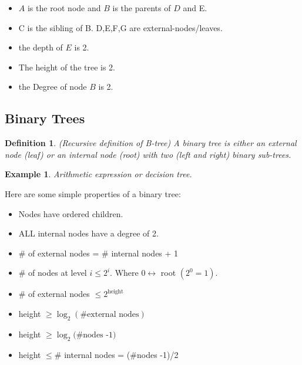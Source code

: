 \documentclass[9pt]{article} %
\newtheorem*{def_}{Definition}
\newtheorem{ex}{Example}
\begin{document}
		\begin{center}
		\end{center}
		\begin{itemize}
			\item $A$ is the root node and $B$ is the parents of $D$ and E.
			\item C is the sibling of B. D,E,F,G are external-nodes/leaves.
			\item the depth of $E$ is 2.
			\item The height of the tree is 2.
			\item the Degree of node $B$ is 2.
		\end{itemize}
		
		\subsection*{Binary Trees}
		
		\begin{def_}
			(Recursive definition of B-tree) A binary tree is either an external node (leaf) or an internal node (root) with two (left and right) binary sub-trees.
		\end{def_}
		\begin{ex}
			Arithmetic expression or decision tree.
		\end{ex}
		Here are some simple properties of a binary tree:
		\begin{itemize}
			\item Nodes have ordered children.
			\item ALL internal nodes have a degree of 2.
			\item \# of external nodes = \# internal nodes + 1
			\item \# of nodes at level $i \leq 2^i$. Where $0 \leftrightarrow$ root $(2^0 = 1)$.
			\item \# of external nodes $\leq 2^{\text{height}}$
			\item height $\geq \log_2{\left(\text{\# external nodes}\right)}$
			\item height $\geq \log_2{\text{(\# nodes -1)}}$
			\item height $\leq \#$ internal nodes = (\#nodes -1)/2
		\end{itemize}
		
\end{document}
